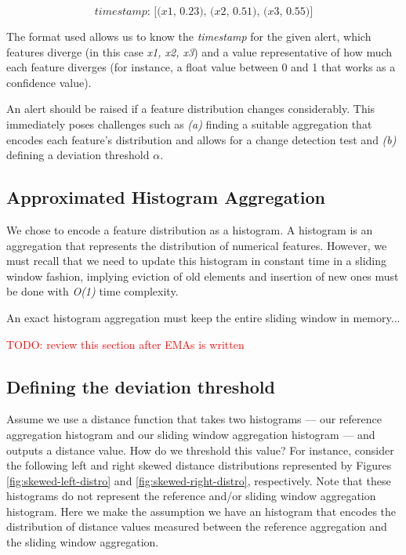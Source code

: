 \[\textit{timestamp: [(x1, 0.23), (x2, 0.51), (x3, 0.55)}]\]

The format used allows us to know the \textit{timestamp} for the given alert, which features diverge (in this case \textit{x1, x2, x3}) and a value representative of how much each feature diverges (for instance, a float value between 0 and 1 that works as a confidence value). 

An alert should be raised if a feature distribution changes considerably. This immediately poses challenges such as \textit{(a)} finding a suitable aggregation that encodes each feature's distribution and allows for a change detection test and \textit{(b)} defining a deviation threshold $\alpha$.

\subsection*{Approximated Histogram Aggregation} \label{sec:ema-hist}

We chose to encode a feature distribution as a histogram. A histogram is an aggregation that represents the distribution of numerical features. However, we must recall that we need to update this histogram in constant time in a sliding window fashion, implying eviction of old elements and insertion of new ones must be done with \textit{O(1)} time complexity.

An exact histogram aggregation must keep the entire sliding window in memory...

\textcolor{red}{TODO: review this section after EMAs is written}

\subsection*{Defining the deviation threshold}

Assume we use a distance function that takes two histograms --- our reference aggregation histogram and our sliding window aggregation histogram --- and outputs a distance value. How do we threshold this value? For instance, consider the following left and right skewed distance distributions represented by Figures \ref{fig:skewed-left-distro} and \ref{fig:skewed-right-distro}, respectively. Note that these histograms do not represent the reference and/or sliding window aggregation histogram. Here we make the assumption we have an histogram that encodes the distribution of distance values measured between the reference aggregation and the sliding window aggregation.

